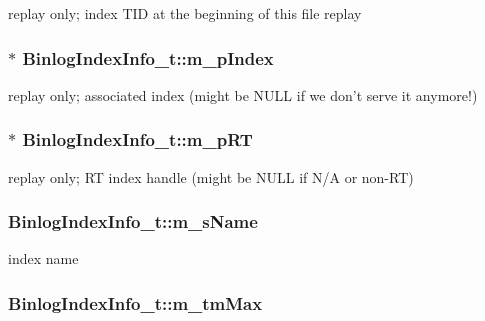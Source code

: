 replay only; index T\-I\-D at the beginning of this file replay 

\hypertarget{structBinlogIndexInfo__t_a1d49a0ea83bebbe1b7aa498b310f3125}{
\subsubsection[{m\-\_\-p\-Index}]{$\ast$ Binlog\-Index\-Info\-\_\-t\-::m\-\_\-p\-Index}}\label{structBinlogIndexInfo__t_a1d49a0ea83bebbe1b7aa498b310f3125}


replay only; associated index (might be N\-U\-L\-L if we don't serve it anymore!) 

\hypertarget{structBinlogIndexInfo__t_a62214ee8f32b300129216d1fe42b0350}{
\subsubsection[{m\-\_\-p\-R\-T}]{$\ast$ Binlog\-Index\-Info\-\_\-t\-::m\-\_\-p\-R\-T}}\label{structBinlogIndexInfo__t_a62214ee8f32b300129216d1fe42b0350}


replay only; R\-T index handle (might be N\-U\-L\-L if N/\-A or non-\/\-R\-T) 

\hypertarget{structBinlogIndexInfo__t_aee6b5463460b2a5a090eb197b53ae2be}{
\subsubsection[{m\-\_\-s\-Name}]{ Binlog\-Index\-Info\-\_\-t\-::m\-\_\-s\-Name}}\label{structBinlogIndexInfo__t_aee6b5463460b2a5a090eb197b53ae2be}


index name 

\hypertarget{structBinlogIndexInfo__t_a726a0f334827bbdcac2d0ca81d1936ac}{
\subsubsection[{m\-\_\-tm\-Max}]{ Binlog\-Index\-Info\-\_\-t\-::m\-\_\-tm\-Max}}\label{structBinlogIndexInfo__t_a726a0f334827bbdcac2d0ca81d1936ac}


